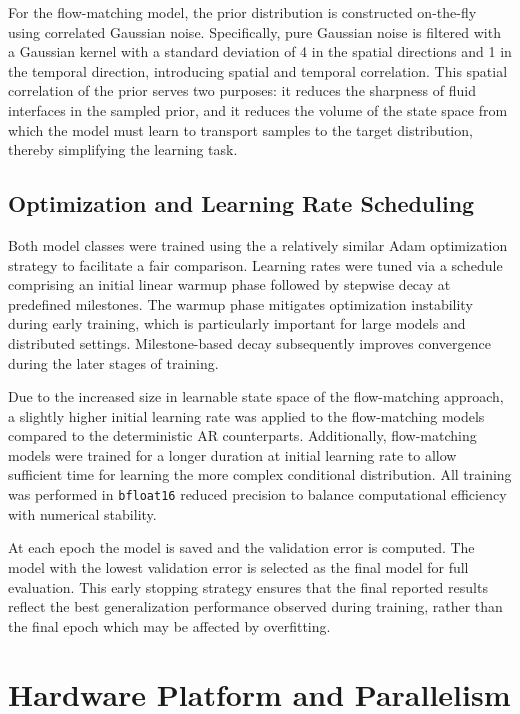 For the flow-matching model, the prior distribution is constructed on-the-fly using correlated Gaussian noise. Specifically, pure Gaussian noise is filtered with a Gaussian kernel with a standard deviation of 4 in the spatial directions and 1 in the temporal direction, introducing spatial and temporal correlation. This spatial correlation of the prior serves two purposes: it reduces the sharpness of fluid interfaces in the sampled prior, and it reduces the volume of the state space from which the model must learn to transport samples to the target distribution, thereby simplifying the learning task.

\subsection{Optimization and Learning Rate Scheduling}

Both model classes were trained using the a relatively similar Adam optimization strategy to facilitate a fair comparison. Learning rates were tuned via a schedule comprising an initial linear warmup phase followed by stepwise decay at predefined milestones. The warmup phase mitigates optimization instability during early training, which is particularly important for large models and distributed settings. Milestone-based decay subsequently improves convergence during the later stages of training.

Due to the increased size in learnable state space of the flow-matching approach, a slightly higher initial learning rate was applied to the flow-matching models compared to the deterministic AR counterparts. Additionally, flow-matching models were trained for a longer duration at initial learning rate to allow sufficient time for learning the more complex conditional distribution. All training was performed in \texttt{bfloat16} reduced precision to balance computational efficiency with numerical stability.

At each epoch the model is saved and the validation error is computed. The model with the lowest validation error is selected as the final model for full evaluation. This early stopping strategy ensures that the final reported results reflect the best generalization performance observed during training, rather than the final epoch which may be affected by overfitting.

\section{Hardware Platform and Parallelism}

